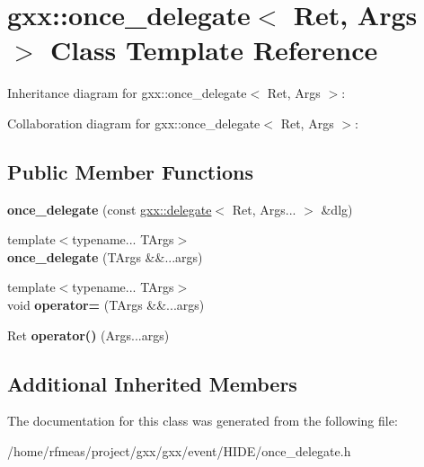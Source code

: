 \hypertarget{classgxx_1_1once__delegate}{}\section{gxx\+:\+:once\+\_\+delegate$<$ Ret, Args $>$ Class Template Reference}
\label{classgxx_1_1once__delegate}


Inheritance diagram for gxx\+:\+:once\+\_\+delegate$<$ Ret, Args $>$\+:


Collaboration diagram for gxx\+:\+:once\+\_\+delegate$<$ Ret, Args $>$\+:
\subsection*{Public Member Functions}
\begin{DoxyCompactItemize}
\item 
{\bfseries once\+\_\+delegate} (const \hyperlink{classgxx_1_1delegate}{gxx\+::delegate}$<$ Ret, Args... $>$ \&dlg)\hypertarget{classgxx_1_1once__delegate_a373ca7b9d120e8d574b3cf8362bbf20b}{}\label{classgxx_1_1once__delegate_a373ca7b9d120e8d574b3cf8362bbf20b}

\item 
{\footnotesize template$<$typename... T\+Args$>$ }\\{\bfseries once\+\_\+delegate} (T\+Args \&\&...args)\hypertarget{classgxx_1_1once__delegate_af947eadfac65f56b0cf446f0d43f0e60}{}\label{classgxx_1_1once__delegate_af947eadfac65f56b0cf446f0d43f0e60}

\item 
{\footnotesize template$<$typename... T\+Args$>$ }\\void {\bfseries operator=} (T\+Args \&\&...args)\hypertarget{classgxx_1_1once__delegate_aee1783b954deb03a7c46e6d1b1c64884}{}\label{classgxx_1_1once__delegate_aee1783b954deb03a7c46e6d1b1c64884}

\item 
Ret {\bfseries operator()} (Args...\+args)\hypertarget{classgxx_1_1once__delegate_a258dca6fed8176ab2f3bc3575cb376c9}{}\label{classgxx_1_1once__delegate_a258dca6fed8176ab2f3bc3575cb376c9}

\end{DoxyCompactItemize}
\subsection*{Additional Inherited Members}


The documentation for this class was generated from the following file\+:\begin{DoxyCompactItemize}
\item 
/home/rfmeas/project/gxx/gxx/event/\+H\+I\+D\+E/once\+\_\+delegate.\+h\end{DoxyCompactItemize}
